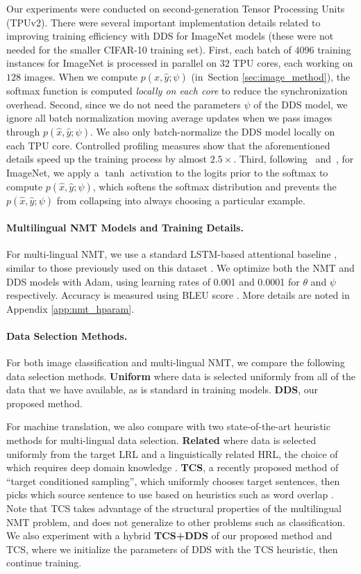 Our experiments were conducted on second-generation Tensor Processing Units (TPUv2). There were several important implementation details related to improving training efficiency with DDS for ImageNet models (these were not needed for the smaller CIFAR-10 training set). First, each batch of $4096$ training instances for ImageNet is processed in parallel on $32$ TPU cores, each working on $128$ images. When we compute $p(\hat{x}, \hat{y}; \psi)$ (in~Section \ref{sec:image_method}), the softmax function is computed \textit{locally on each core} to reduce the synchronization overhead. Second, since we do not need the parameters $\psi$ of the DDS model, we ignore all batch normalization moving average updates when we pass images through $p(\hat{x}, \hat{y}; \psi)$. We also only batch-normalize the DDS model locally on each TPU core. Controlled profiling measures show that the aforementioned details speed up the training process by almost $2.5 \times$. Third, following~\citet{neural_combi} and~\citet{enas}, for ImageNet, we apply a $\tanh$ activation to the logits prior to the softmax to compute $p(\hat{x}, \hat{y}; \psi)$, which softens the softmax distribution and prevents the $p(\hat{x}, \hat{y}; \psi)$ from collapsing into always choosing a particular example.

\paragraph{Multilingual NMT Models and Training Details.}
For multi-lingual NMT, we use a standard LSTM-based attentional baseline \cite{attention}, similar to those previously used on this dataset \cite{rapid_adapt_nmt}.
We optimize both the NMT and DDS models with Adam, using learning rates of 0.001 and 0.0001 for $\theta$ and $\psi$ respectively.
Accuracy is measured using BLEU score \cite{bleu}.
More details are noted in Appendix \ref{app:nmt_hparam}.

\paragraph{Data Selection Methods.}
For both image classification and multi-lingual NMT, we compare the following data selection methods.
\textbf{Uniform} where data is selected uniformly from all of the data that we have available, as is standard in training models.
\textbf{DDS}, our proposed method.

For machine translation, we also compare with two state-of-the-art heuristic methods for multi-lingual data selection.
\textbf{Related} where data is selected uniformly from the target LRL and a linguistically related HRL, the choice of which requires deep domain knowledge \cite{rapid_adapt_nmt}.
\textbf{TCS}, a recently proposed method of ``target conditioned sampling'', which uniformly chooses target sentences, then picks which source sentence to use based on heuristics such as word overlap \cite{TCS}.
Note that TCS takes advantage of the structural properties of the multilingual NMT problem, and does not generalize to other problems such as classification.
We also experiment with a hybrid \textbf{TCS+DDS} of our proposed method and TCS, where we initialize the parameters of DDS with the TCS heuristic, then continue training.

